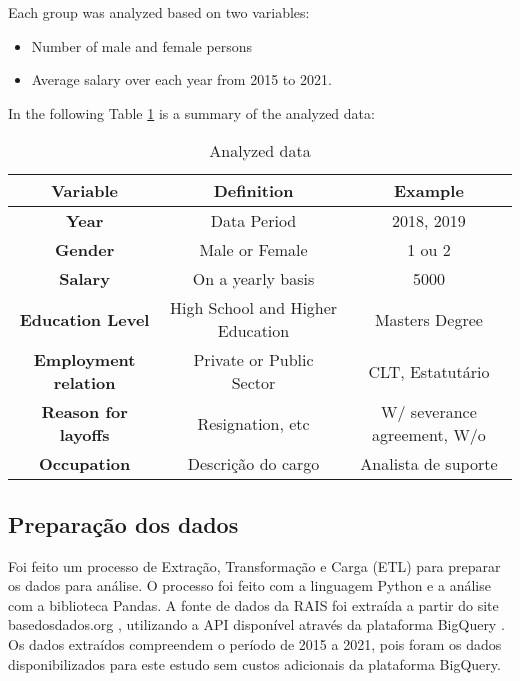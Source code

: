 Each group was analyzed based on two variables:

\begin{itemize}
	\item Number of male and female persons	      	      	      	      	      
	\item Average salary over each year from 2015 to 2021.	    
\end{itemize}
	      	      	      
In the following Table \ref{vars} is a summary of the analyzed data:     

\begin{table}[htbp]
	\caption{Analyzed data}
	\begin{center}
		\begin{tabular}{|c|c|c|}
			\hline
			\textbf{Variable}           & \textbf{Definition}      & \textbf{Example}    \\ 
			\hline 
			\textbf{Year}                 & Data Period        & 2018, 2019          \\
			\hline
			\textbf{Gender}                & Male or Female     & 1 ou 2              \\
			\hline
			\textbf{Salary}            & On a yearly basis           & 5000                \\
			\hline 
			\textbf{Education Level}  & High School and Higher Education   & Masters Degree            \\
			\hline 
			\textbf{Employment relation}    & Private or Public Sector  & CLT, Estatutário   \\
			\hline 
			\textbf{Reason for layoffs} & Resignation, etc & W/ severance agreement, W/o     \\
			\hline
			\textbf{Occupation}          & Descrição do cargo      & Analista de suporte \\
			\hline 
		\end{tabular}
		\label{vars}
	\end{center} 
\end{table}      	      

\subsection{Preparação dos dados}

Foi feito um processo de Extração, Transformação e Carga (ETL) para preparar os dados para análise. O processo foi feito com a linguagem Python e a análise com a biblioteca Pandas. A fonte de dados da RAIS foi extraída a partir do site basedosdados.org \cite{basedosdados}, utilizando a API disponível através da plataforma BigQuery \cite{bigquery}. Os dados extraídos compreendem o período de 2015 a 2021, pois foram os dados disponibilizados para este estudo sem custos adicionais da plataforma BigQuery. 

